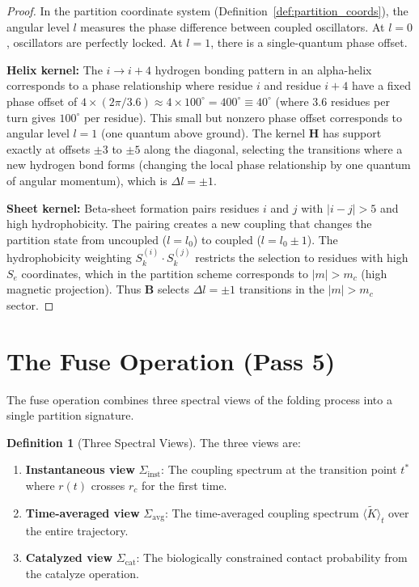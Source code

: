 \documentclass[11pt,twocolumn,a4paper]{article}
\theoremstyle{definition}
\newtheorem{definition}[theorem]{Definition}
\theoremstyle{remark}
\newcommand{\Sig}{\Sigma}
\newcommand{\Sk}{S_k}
\newcommand{\Se}{S_e}
\newcommand{\Ktilde}{\tilde{K}}
\newcommand{\orderpar}{r}
\begin{document}
\begin{proof}
In the partition coordinate system (Definition~\ref{def:partition_coords}), the angular level $l$ measures the phase difference between coupled oscillators. At $l = 0$, oscillators are perfectly locked. At $l = 1$, there is a single-quantum phase offset.

\textbf{Helix kernel:} The $i \to i+4$ hydrogen bonding pattern in an alpha-helix corresponds to a phase relationship where residue $i$ and residue $i+4$ have a fixed phase offset of $4 \times (2\pi / 3.6) \approx 4 \times 100^\circ = 400^\circ \equiv 40^\circ$ (where 3.6 residues per turn gives $100^\circ$ per residue). This small but nonzero phase offset corresponds to angular level $l = 1$ (one quantum above ground). The kernel $\mathbf{H}$ has support exactly at offsets $\pm 3$ to $\pm 5$ along the diagonal, selecting the transitions where a new hydrogen bond forms (changing the local phase relationship by one quantum of angular momentum), which is $\Delta l = \pm 1$.

\textbf{Sheet kernel:} Beta-sheet formation pairs residues $i$ and $j$ with $|i - j| > 5$ and high hydrophobicity. The pairing creates a new coupling that changes the partition state from uncoupled ($l = l_0$) to coupled ($l = l_0 \pm 1$). The hydrophobicity weighting $\Sk^{(i)} \cdot \Sk^{(j)}$ restricts the selection to residues with high $\Se$ coordinates, which in the partition scheme corresponds to $|m| > m_c$ (high magnetic projection). Thus $\mathbf{B}$ selects $\Delta l = \pm 1$ transitions in the $|m| > m_c$ sector.
\end{proof}



\section{The Fuse Operation (Pass 5)}
\label{sec:fuse}

The fuse operation combines three spectral views of the folding process into a single partition signature.

\begin{definition}[Three Spectral Views]
\label{def:three_views}
The three views are:
\begin{enumerate}
    \item \textbf{Instantaneous view} $\Sig_{\text{inst}}$: The coupling spectrum at the transition point $t^*$ where $\orderpar(t)$ crosses $\orderpar_c$ for the first time.
    \item \textbf{Time-averaged view} $\Sig_{\text{avg}}$: The time-averaged coupling spectrum $\langle \Ktilde \rangle_t$ over the entire trajectory.
    \item \textbf{Catalyzed view} $\Sig_{\text{cat}}$: The biologically constrained contact probability from the catalyze operation.
\end{enumerate}
\end{definition}
\end{document}

